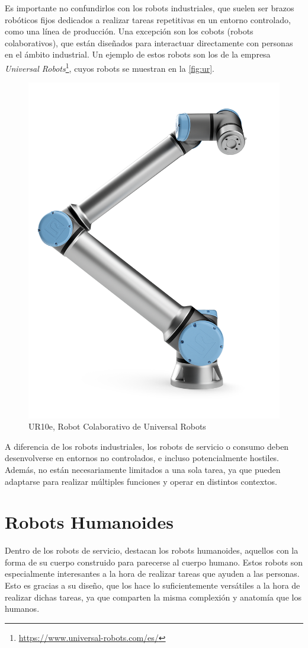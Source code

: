 Es importante no confundirlos con los robots industriales, que suelen ser brazos robóticos fijos dedicados a realizar tareas repetitivas en un entorno controlado, como una línea de producción. Una excepción son los cobots (robots colaborativos), que están diseñados para interactuar directamente con personas en el ámbito industrial. Un ejemplo de estos robots son los de la empresa \textit{Universal Robots}\footnote{\url{https://www.universal-robots.com/es/}}, cuyos robots se muestran en la \autoref{fig:ur}.

\begin{figure}[H]
    \centering
    \includegraphics[height=0.7\textwidth]{figures/cap_1/ur10e.png}
    \caption{UR10e, Robot Colaborativo de Universal Robots}
    \label{fig:ur}
\end{figure}

A diferencia de los robots industriales, los robots de servicio o consumo deben desenvolverse en entornos no controlados, e incluso potencialmente hostiles. Además, no están necesariamente limitados a una sola tarea, ya que pueden adaptarse para realizar múltiples funciones y operar en distintos contextos.

\section{Robots Humanoides}

Dentro de los robots de servicio, destacan los robots humanoides, aquellos con la forma de su cuerpo construido para parecerse al cuerpo humano. Estos robots son especialmente interesantes a la hora de realizar tareas que ayuden a las personas. Esto es gracias a su diseño, que los hace lo suficientemente versátiles a la hora de realizar dichas tareas, ya que comparten la misma complexión y anatomía que los humanos.

